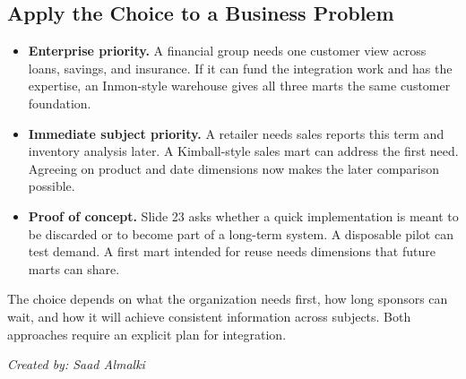 \documentclass[12pt,a4paper]{article}
\begin{document}
\subsection{Apply the Choice to a Business Problem}
\begin{itemize}
\item \textbf{Enterprise priority.} A financial group needs one customer view across loans, savings, and insurance. If it can fund the integration work and has the expertise, an Inmon-style warehouse gives all three marts the same customer foundation.
\item \textbf{Immediate subject priority.} A retailer needs sales reports this term and inventory analysis later. A Kimball-style sales mart can address the first need. Agreeing on product and date dimensions now makes the later comparison possible.
\item \textbf{Proof of concept.} Slide 23 asks whether a quick implementation is meant to be discarded or to become part of a long-term system. A disposable pilot can test demand. A first mart intended for reuse needs dimensions that future marts can share.
\end{itemize}
The choice depends on what the organization needs first, how long sponsors can wait, and how it will achieve consistent information across subjects. Both approaches require an explicit plan for integration.

\begin{flushright}\textit{Created by: Saad Almalki}\end{flushright}
\end{document}
